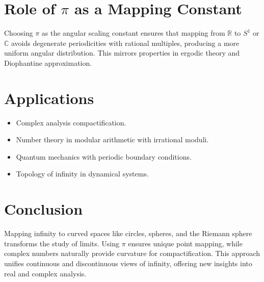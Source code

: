 \documentclass[12pt]{article}
\begin{document}
\section{Role of $\pi$ as a Mapping Constant}
Choosing $\pi$ as the angular scaling constant ensures that mapping from $\mathbb{R}$ to $S^1$ or $\mathbb{C}$ avoids degenerate periodicities with rational multiples, producing a more uniform angular distribution. This mirrors properties in ergodic theory and Diophantine approximation.

\section{Applications}
\begin{itemize}
    \item Complex analysis compactification.
    \item Number theory in modular arithmetic with irrational moduli.
    \item Quantum mechanics with periodic boundary conditions.
    \item Topology of infinity in dynamical systems.
\end{itemize}

\section{Conclusion}
Mapping infinity to curved spaces like circles, spheres, and the Riemann sphere transforms the study of limits. Using $\pi$ ensures unique point mapping, while complex numbers naturally provide curvature for compactification. This approach unifies continuous and discontinuous views of infinity, offering new insights into real and complex analysis.
\end{document}
